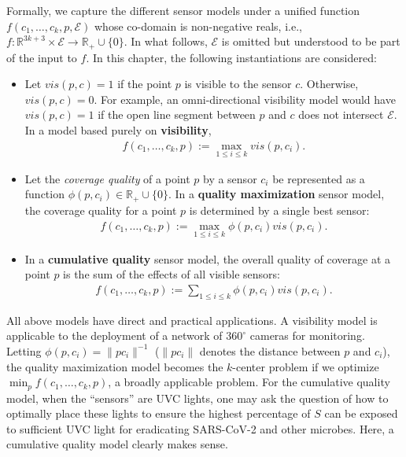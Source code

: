 Formally, we capture the different sensor models under a unified function $f(c_1, \ldots, c_k, p, \mathcal E)$ whose co-domain is non-negative reals, i.e., $f: \mathbb R^{3k + 3} \times \mathcal E \to \mathbb R_+\cup\{0\}$. In what follows, $\mathcal E$ is omitted but understood to be part of the input to $f$. In this chapter, the following instantiations are considered:
\begin{itemize}[leftmargin=4mm]
    \item Let $vis(p, c) = 1$ if the point $p$ is visible to the sensor $c$. Otherwise, $vis(p, c) = 0$. For example, an omni-directional visibility model would have $vis(p, c) = 1$ if the open line segment between $p$ and $c$ does not intersect $\mathcal E$. In a model based purely on \textbf{visibility},  
    \begin{align}
    f(c_1, \ldots, c_k, p) := \max_{1\le i \le k}vis(p, c_i).\label{f:surf-1}
    \end{align}
    \item Let the \emph{coverage quality} of a point $p$ by a sensor $c_i$ be represented as a function $\phi(p, c_i) \in \mathbb R_+\cup\{0\}$. In a \textbf{quality maximization} sensor model,  the coverage quality for a point $p$ is determined by a single best sensor:  
    \begin{align}f(c_1, \ldots, c_k, p) := \max_{1\le i \le k} \phi(p, c_i)vis(p, c_i).\label{f:surf-2}
    \end{align}
    \item In a \textbf{cumulative quality} sensor model, the overall quality of coverage at a point $p$ is the sum of the effects of all visible sensors:
    \begin{align}f(c_1, \ldots, c_k, p) := \sum_{1\le i \le k}\phi(p, c_i)vis(p, c_i).\label{f:surf-3}
    \end{align}
\end{itemize}



All above models have direct and practical applications. 
A visibility model is applicable to the deployment of a network of $360^{\circ}$ cameras for monitoring. 
Letting $\phi(p, c_i) = \lVert pc_i\rVert^{-1}$ ($\lVert pc_i\rVert$ denotes the distance between $p$ and $c_i$), 
the quality maximization model becomes the $k$-center problem \cite{weber1929theory} if we optimize $\min_p f(c_1, \ldots, c_k, p)$, 
a broadly applicable problem. For the cumulative quality model, when the ``sensors'' are UVC lights, 
one may ask the question of how to optimally place these lights to ensure the highest percentage of $S$ can be exposed to sufficient UVC light for eradicating SARS-CoV-2 and other microbes. 
Here, a cumulative quality model clearly makes sense. 

